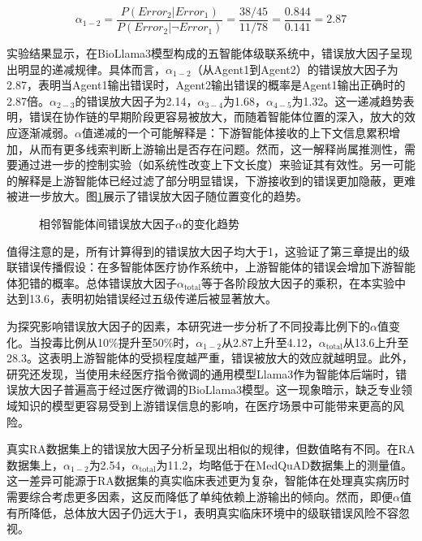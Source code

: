 \begin{equation}
\alpha_{1-2} = \frac{P(Error_2|Error_1)}{P(Error_2|\neg Error_1)} = \frac{38/45}{11/78} = \frac{0.844}{0.141} = 2.87
\end{equation}

实验结果显示，在BioLlama3模型构成的五智能体级联系统中，错误放大因子呈现出明显的递减规律。具体而言，$\alpha_{1-2}$（从Agent1到Agent2）的错误放大因子为2.87，表明当Agent1输出错误时，Agent2输出错误的概率是Agent1输出正确时的2.87倍。$\alpha_{2-3}$的错误放大因子为2.14，$\alpha_{3-4}$为1.68，$\alpha_{4-5}$为1.32。这一递减趋势表明，错误在协作链的早期阶段更容易被放大，而随着智能体位置的深入，放大的效应逐渐减弱。$\alpha$值递减的一个可能解释是：下游智能体接收的上下文信息累积增加，从而有更多线索判断上游输出是否存在问题。然而，这一解释尚属推测性，需要通过进一步的控制实验（如系统性改变上下文长度）来验证其有效性。另一可能的解释是上游智能体已经过滤了部分明显错误，下游接收到的错误更加隐蔽，更难被进一步放大。图\ref{fig:alpha-trend}展示了错误放大因子随位置变化的趋势。

\begin{figure}[htbp]
\centering
{}
\caption{相邻智能体间错误放大因子$\alpha$的变化趋势}
\label{fig:alpha-trend}
\end{figure}

值得注意的是，所有计算得到的错误放大因子均大于1，这验证了第三章提出的级联错误传播假设：在多智能体医疗协作系统中，上游智能体的错误会增加下游智能体犯错的概率。总体错误放大因子$\alpha_{\text{total}}$等于各阶段放大因子的乘积，在本实验中达到13.6，表明初始错误经过五级传递后被显著放大。

为探究影响错误放大因子的因素，本研究进一步分析了不同投毒比例下的$\alpha$值变化。当投毒比例从10\%提升至50\%时，$\alpha_{1-2}$从2.87上升至4.12，$\alpha_{\text{total}}$从13.6上升至28.3。这表明上游智能体的受损程度越严重，错误被放大的效应就越明显。此外，研究还发现，当使用未经医疗指令微调的通用模型Llama3作为智能体后端时，错误放大因子普遍高于经过医疗微调的BioLlama3模型。这一现象暗示，缺乏专业领域知识的模型更容易受到上游错误信息的影响，在医疗场景中可能带来更高的风险。

真实RA数据集上的错误放大因子分析呈现出相似的规律，但数值略有不同。在RA数据集上，$\alpha_{1-2}$为2.54，$\alpha_{\text{total}}$为11.2，均略低于在MedQuAD数据集上的测量值。这一差异可能源于RA数据集的真实临床表述更为复杂，智能体在处理真实病历时需要综合考虑更多因素，这反而降低了单纯依赖上游输出的倾向。然而，即便$\alpha$值有所降低，总体放大因子仍远大于1，表明真实临床环境中的级联错误风险不容忽视。

